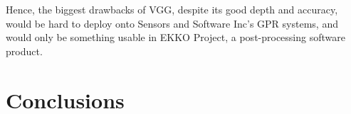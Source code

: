 \documentclass[se,blockletter]{uw-wkrpt}
\begin{document}
Hence, the biggest drawbacks of VGG, despite its good depth and accuracy, would be hard to deploy onto Sensors and Software Inc’s GPR systems, and would only be something usable in EKKO Project, a post-processing software product.




%



\section{Conclusions}
\end{document}
